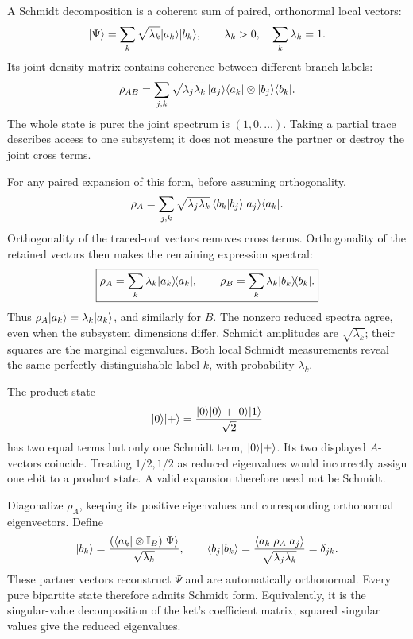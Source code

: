 A Schmidt decomposition is a coherent sum of paired, orthonormal local vectors:
\[
\lvert\Psi\rangle=\sum_k\sqrt{\lambda_k}\lvert a_k\rangle\lvert b_k\rangle,
\qquad \lambda_k>0,\quad\sum_k\lambda_k=1.
\]
Its joint density matrix contains coherence between different branch labels:
\[
\rho_{AB}=\sum_{j,k}\sqrt{\lambda_j\lambda_k}\,
\lvert a_j\rangle\langle a_k\rvert\otimes\lvert b_j\rangle\langle b_k\rvert.
\]
The whole state is pure: the joint spectrum is \((1,0,\ldots)\). Taking a partial trace describes access to one subsystem; it does not measure the partner or destroy the joint cross terms.

For any paired expansion of this form, before assuming orthogonality,
\[
\rho_A=\sum_{j,k}\sqrt{\lambda_j\lambda_k}\,
\langle b_k|b_j\rangle\lvert a_j\rangle\langle a_k\rvert.
\]
Orthogonality of the traced-out vectors removes cross terms. Orthogonality of the retained vectors then makes the remaining expression spectral:
\[
\boxed{\rho_A=\sum_k\lambda_k\lvert a_k\rangle\!\langle a_k\rvert,\qquad
\rho_B=\sum_k\lambda_k\lvert b_k\rangle\!\langle b_k\rvert.}
\]
Thus \(\rho_A\lvert a_k\rangle=\lambda_k\lvert a_k\rangle\), and similarly for \(B\). The nonzero reduced spectra agree, even when the subsystem dimensions differ. Schmidt amplitudes are \(\sqrt{\lambda_k}\); their squares are the marginal eigenvalues. Both local Schmidt measurements reveal the same perfectly distinguishable label \(k\), with probability \(\lambda_k\).

The product state
\[
\lvert0\rangle\lvert+\rangle=\frac{\lvert0\rangle\lvert0\rangle+\lvert0\rangle\lvert1\rangle}{\sqrt2}
\]
has two equal terms but only one Schmidt term, \(\lvert0\rangle\lvert+\rangle\). Its two displayed \(A\)-vectors coincide. Treating \(1/2,1/2\) as reduced eigenvalues would incorrectly assign one ebit to a product state. A valid expansion therefore need not be Schmidt.

Diagonalize \(\rho_A\), keeping its positive eigenvalues and corresponding orthonormal eigenvectors. Define
\[
\lvert b_k\rangle=\frac{(\langle a_k\rvert\otimes\mathbb I_B)\lvert\Psi\rangle}{\sqrt{\lambda_k}},
\qquad
\langle b_j|b_k\rangle
=\frac{\langle a_k\rvert\rho_A\lvert a_j\rangle}{\sqrt{\lambda_j\lambda_k}}
=\delta_{jk}.
\]
These partner vectors reconstruct \(\Psi\) and are automatically orthonormal. Every pure bipartite state therefore admits Schmidt form. Equivalently, it is the singular-value decomposition of the ket's coefficient matrix; squared singular values give the reduced eigenvalues.

